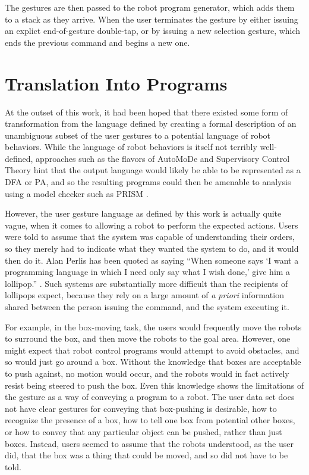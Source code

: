 The gestures are then passed to the robot program generator, which adds them to a stack as they arrive. 
When the user terminates the gesture by either issuing an explict end-of-gesture double-tap, or by issuing a new selection gesture, which ends the previous command and begins a new one. 


\section{Translation Into Programs}
At the outset of this work, it had been hoped that there existed some form of transformation from the language defined by creating a formal description of an unambiguous subset of the user gestures to a potential language of robot behaviors. 
While the language of robot behaviors is itself not terribly well-defined, approaches such as the flavors of AutoMoDe and Supervisory Control Theory hint that the output language would likely be able to be represented as a DFA or PA, and so the resulting programs could then be amenable to analysis using a model checker such as PRISM \citep{KNP11}.

However, the user gesture language as defined by this work is actually quite vague, when it comes to allowing a robot to perform the expected actions. 
Users were told to assume that the system was capable of understanding their orders, so they merely had to indicate what they wanted the system to do, and it would then do it. 
Alan Perlis has been quoted as saying ``When someone says `I want a programming language in which I need only say what I wish done,' give him a lollipop.'' \citep{PerlisYaleLolz}.  
Such systems are substantially more difficult than the recipients of lollipops expect, because they rely on a large amount of \emph{a priori} information shared between the person issuing the command, and the system executing it. 

For example, in the box-moving task, the users would frequently move the robots to surround the box, and then move the robots to the goal area. 
However, one might expect that robot control programs would attempt to avoid obstacles, and so would just go around a box. 
Without the knowledge that boxes are acceptable to push against, no motion would occur, and the robots would in fact actively resist being steered to push the box. 
Even this knowledge shows the limitations of the gesture as a way of conveying a program to a robot.
The user data set does not have clear gestures for conveying that box-pushing is desirable, how to recognize the presence of a box, how to tell one box from potential other boxes, or how to convey that any particular object can be pushed, rather than just boxes. 
Instead, users seemed to assume that the robots understood, as the user did, that the box was a thing that could be moved, and so did not have to be told.

